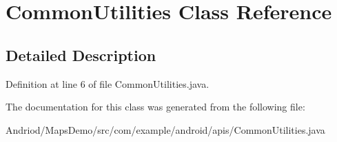 \hypertarget{classcom_1_1example_1_1android_1_1apis_1_1_common_utilities}{\section{Common\-Utilities Class Reference}
\label{classcom_1_1example_1_1android_1_1apis_1_1_common_utilities}
}


\subsection{Detailed Description}


Definition at line 6 of file Common\-Utilities.\-java.



The documentation for this class was generated from the following file\-:\begin{DoxyCompactItemize}
\item 
Andriod/\-Maps\-Demo/src/com/example/android/apis/Common\-Utilities.\-java\end{DoxyCompactItemize}
